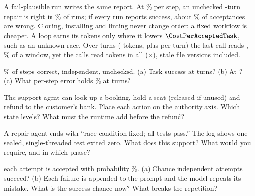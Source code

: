 \documentclass{studysheet}
\begin{document}
\begin{rightcol}
%
  {A fail-plausible run writes the same report. At \% per step, an unchecked -turn repair
   is right in \% of runs; if every run reports success, about \% of acceptances are wrong.}{}
%
  {Cloning, installing and linting never change order: a fixed workflow is cheaper. A loop earns its
   tokens only where it lowers $\CostPerAcceptedTask$, such as an unknown race.}{}
%
  {Over  turns ( tokens, plus  per turn) the last call reads
   , \% of a  window, yet the calls read  tokens in all
   ($\times$), stale file versions included.}{}

\vspace{2pt}
\begin{qs}
\item \assumed{} \% of steps correct, independent, unchecked. (a) Task
  success at  turns? (b) At ? (c) What per-step error holds \% at  turns?
\item The support agent can look up a booking, hold a seat (released if unused) and refund to the
  customer's bank. Place each action on the authority axis. Which state levels? What must
  the runtime add before the refund?
\item A repair agent ends with ``race condition fixed; all tests pass.'' The log shows one sealed,
  single-threaded test exited zero. What does this support? What would you require, and in which phase?
\item \assumed{} each attempt is accepted with probability \%. (a) Chance 
  independent attempts succeed? (b) Each failure is appended to the prompt and the model repeats its mistake.
  What is the success chance now? What breaks the repetition?
\end{qs}
\end{rightcol}
\end{document}
